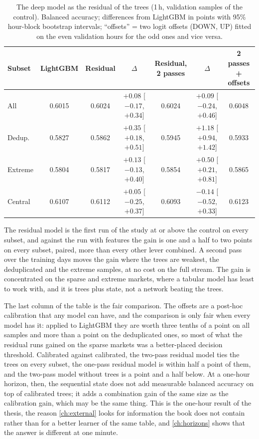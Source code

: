 \begin{table}[t]
\centering
\caption{The deep model as the residual of the trees (1\,h, validation samples of the control).
Balanced accuracy; differences from LightGBM in points with 95\% hour-block bootstrap intervals;
``offsets'' = two logit offsets (DOWN, UP) fitted on the even validation hours for the odd ones and
vice versa.}
\label{tab:exp:residual}
\small
\begin{fittable}\begin{tabular}{lcccccc}
\toprule
Subset & LightGBM & Residual & $\Delta$ & Residual, 2 passes & $\Delta$ & 2 passes + offsets \\
\midrule
All      & 0.6015 & 0.6024 & $+0.08$ [$-0.17$, $+0.34$] & 0.6024 & $+0.09$ [$-0.24$, $+0.46$] & 0.6048 \\
Dedup.   & 0.5827 & 0.5862 & $+0.35$ [$+0.18$, $+0.51$] & 0.5945 & $+1.18$ [$+0.94$, $+1.42$] & 0.5933 \\
Extreme  & 0.5804 & 0.5817 & $+0.13$ [$-0.13$, $+0.40$] & 0.5854 & $+0.50$ [$+0.21$, $+0.81$] & 0.5865 \\
Central  & 0.6107 & 0.6112 & $+0.05$ [$-0.25$, $+0.37$] & 0.6093 & $-0.14$ [$-0.52$, $+0.33$] & 0.6123 \\
\bottomrule
\end{tabular}\end{fittable}
\end{table}

The residual model is the first run of the study at or above the control on every subset,
and against the run with features the gain is one and a half to two points on every subset,
paired, more than every other lever combined.  A second pass over the training days moves
the gain where the trees are weakest, the deduplicated and the extreme samples, at no cost
on the full stream.  The gain is concentrated on the sparse and extreme markets, where a
tabular model has least to work with, and it is trees plus state, not a network beating the
trees.

The last column of the table is the fair comparison.  The offsets are a post-hoc
calibration that any model can have, and the comparison is only fair when every model has
it: applied to LightGBM they are worth three tenths of a point on all samples and more than
a point on the deduplicated ones, so most of what the residual runs gained on the sparse
markets was a better-placed decision threshold.  Calibrated against calibrated, the two-pass
residual model ties the trees on every subset, the one-pass residual model is within half a
point of them, and the two-pass model without trees is a point and a half below.  At a
one-hour horizon, then, the sequential state does not add measurable balanced accuracy on
top of calibrated trees; it adds a combination gain of the same size as the calibration
gain, which may be the same thing.  This is the one-hour result of the thesis, the reason
\cref{ch:external} looks for information the book does not contain rather than for a better
learner of the same table, and \cref{ch:horizons} shows that the answer is different at
one minute.

